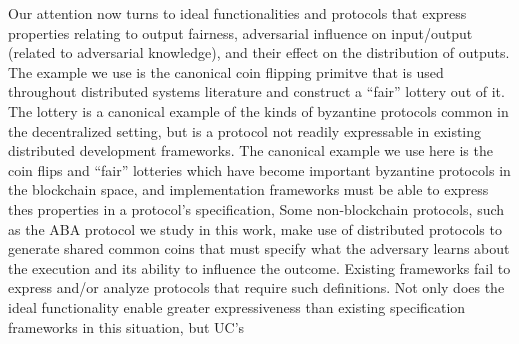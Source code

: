 Our attention now turns to ideal functionalities and protocols that express
properties relating to output fairness, adversarial influence on input/output
(related to adversarial knowledge), and their effect on the distribution of
outputs.  The example we use is the canonical coin flipping primitve that is
used throughout distributed systems literature and construct a ``fair'' lottery
out of it.  The lottery is a canonical example of the kinds of byzantine
protocols common in the decentralized setting, but is a protocol not readily
expressable in existing distributed development frameworks.   The
canonical example we use here is the coin flips and ``fair'' lotteries which
have become important byzantine protocols in the blockchain space, and
implementation frameworks must be able to express thes properties in a
protocol's specification, Some non-blockchain protocols, such as the ABA
protocol we study in this work, make use of distributed protocols to generate
shared common coins that must specify what the adversary learns about the
execution and its ability to influence the outcome.  Existing frameworks fail
to express and/or analyze protocols that require such definitions.  Not only
does the ideal functionality enable greater expressiveness than existing
specification frameworks in this situation, but UC's 


